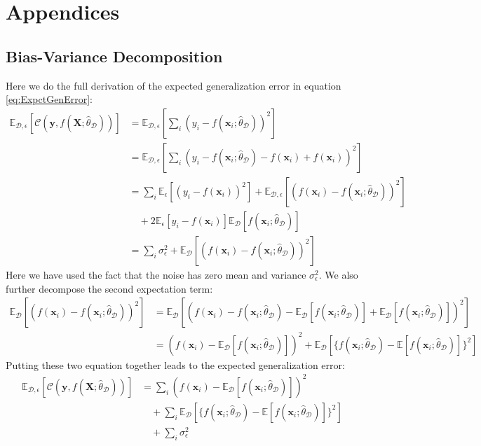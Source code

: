 \documentclass[a4paper, american, 12pt]{report}
\begin{document}
	\appendix
	\part{Appendices}
	\label{part:Appendix}
	
	\chapter{Bias-Variance Decomposition}
	\label{appendix:BiasVarianceDecomp}
	Here we do the full derivation of the expected generalization error in equation \ref{eq:ExpctGenError}:
	\begin{align*}
		\mathds{E}_{\mathcal{D},\epsilon}[\mathcal{C}(\textbf{y},f(\textbf{X};\hat{\theta}_{\mathcal{D}}))]
		&=\mathds{E}_{\mathcal{D},\epsilon}\left[\sum_{i}(y_i-f(\textbf{x}_i;\hat{\theta}_{\mathcal{D}}))^2\right]\\
		&=\mathds{E}_{\mathcal{D},\epsilon}\left[\sum_{i}(y_i-f(\textbf{x}_i;\hat{\theta}_{\mathcal{D}})-f(\textbf{x}_i)+f(\textbf{x}_i))^2\right]\\
		&=\sum_{i} \mathds{E}_{\epsilon}[(y_i-f(\textbf{x}_i))^2]+\mathds{E}_{\mathcal{D},\epsilon}[(f(\textbf{x}_i)-f(\textbf{x}_i;\hat{\theta}_{\mathcal{D}}))^2]\\
		&\quad+2\mathds{E}_{\epsilon}[y_i-f(\textbf{x}_i)]\mathds{E}_{\mathcal{D}}[f(\textbf{x}_i;\hat{\theta}_{\mathcal{D}})]\\
		&=\sum_{i}\sigma_{\epsilon}^2+\mathds{E}_{\mathcal{D}}[(f(\textbf{x}_i)-f(\textbf{x}_i;\hat{\theta}_{\mathcal{D}}))^2]
	\end{align*}
	Here we have used the fact that the noise has zero mean and variance $\sigma_{\epsilon}^2$. We also further decompose the second expectation term:
	\begin{align*}
		\mathds{E}_{\mathcal{D}}[(f(\textbf{x}_i)-f(\textbf{x}_i;\hat{\theta}_{\mathcal{D}}))^2]
		&=\mathds{E}_{\mathcal{D}}\left[(f(\textbf{x}_i)-f(\textbf{x}_i;\hat{\theta}_{\mathcal{D}})-\mathds{E}_{\mathcal{D}}[f(\textbf{x}_i;\hat{\theta}_{\mathcal{D}})]+ \mathds{E}_{\mathcal{D}}[f(\textbf{x}_i;\hat{\theta}_{\mathcal{D}})])^2\right]\\
		&=(f(\textbf{x}_i)-\mathds{E}_{\mathcal{D}}[f(\textbf{x}_i;\hat{\theta}_{\mathcal{D}})])^2+ \mathds{E}_{\mathcal{D}}[\{f(\textbf{x}_i;\hat{\theta}_{\mathcal{D}})-\mathds{E}[f(\textbf{x}_i;\hat{\theta}_{\mathcal{D}})]\}^2]
	\end{align*}
	Putting these two equation together leads to the expected generalization error:
	\begin{align*}
		\mathds{E}_{\mathcal{D},\epsilon}[\mathcal{C}(\textbf{y}, f(\textbf{X};\hat{\theta}_{\mathcal{D}}))]
		&=\sum_i(f(\textbf{x}_i)-\mathds{E}_{\mathcal{D}}[f(\textbf{x}_i;\hat{\theta}_{\mathcal{D}})])^2 \\
		& \quad +\sum_i \mathds{E}_{\mathcal{D}}[\{f(\textbf{x}_i;\hat{\theta}_{\mathcal{D}})-\mathds{E}[f(\textbf{x}_i;\hat{\theta}_{\mathcal{D}})]\}^2]\\
		& \quad + \sum_{i}\sigma_{\epsilon}^2
	\end{align*}
\end{document}
